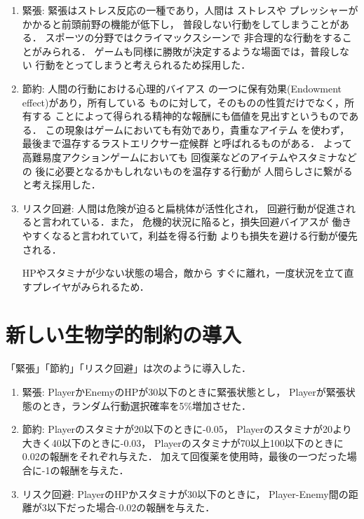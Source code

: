 \documentclass[a4paper,12pt,oneside,openany,titlepage]{jreport}
\begin{document}
 \begin{enumerate}
   \item 緊張: 緊張はストレス反応の一種であり，人間は
         ストレスや
         プレッシャーがかかると前頭前野の機能が低下し，
         普段しない行動をしてしまうことがある．
         スポーツの分野ではクライマックスシーンで
         非合理的な行動をすることがみられる．
         ゲームも同様に勝敗が決定するような場面では，普段しない
         行動をとってしまうと考えられるため採用した．
 
   \item 節約: 人間の行動における心理的バイアス
         の一つに保有効果(Endowment effect)があり，所有している
         ものに対して，そのものの性質だけでなく，所有する
         ことによって得られる精神的な報酬にも価値を見出すというものである．
         この現象はゲームにおいても有効であり，貴重なアイテム
         を使わず，最後まで温存するラストエリクサー症候群
         と呼ばれるものがある．
         よって高難易度アクションゲームにおいても
         回復薬などのアイテムやスタミナなどの
         後に必要となるかもしれないものを温存する行動が
         人間らしさに繋がると考え採用した．
 
 
   \item リスク回避: 
         人間は危険が迫ると扁桃体が活性化され，
         回避行動が促進されると言われている．また，
         危機的状況に陥ると，損失回避バイアスが
         働きやすくなると言われていて，利益を得る行動
         よりも損失を避ける行動が優先される．
         
         HPやスタミナが少ない状態の場合，敵から
         すぐに離れ，一度状況を立て直すプレイヤがみられるため．
         
 \end{enumerate}
 
 
 \section{新しい生物学的制約の導入}
 「緊張」「節約」「リスク回避」は次のように導入した．
 \begin{enumerate}
   \item 緊張: PlayerかEnemyのHPが30以下のときに緊張状態とし，
   Playerが緊張状態のとき，ランダム行動選択確率を5$\%$増加させた．
         
   \item 節約: Playerのスタミナが20以下のときに-0.05，
   Playerのスタミナが20より大きく40以下のときに-0.03，
   Playerのスタミナが70以上100以下のときに0.02の報酬をそれぞれ与えた．
   加えて回復薬を使用時，最後の一つだった場合に-1の報酬を与えた．        
         
   \item リスク回避: PlayerのHPかスタミナが30以下のときに，
   Player-Enemy間の距離が3以下だった場合-0.02の報酬を与えた．
 
 \end{enumerate}
 
\end{document}

